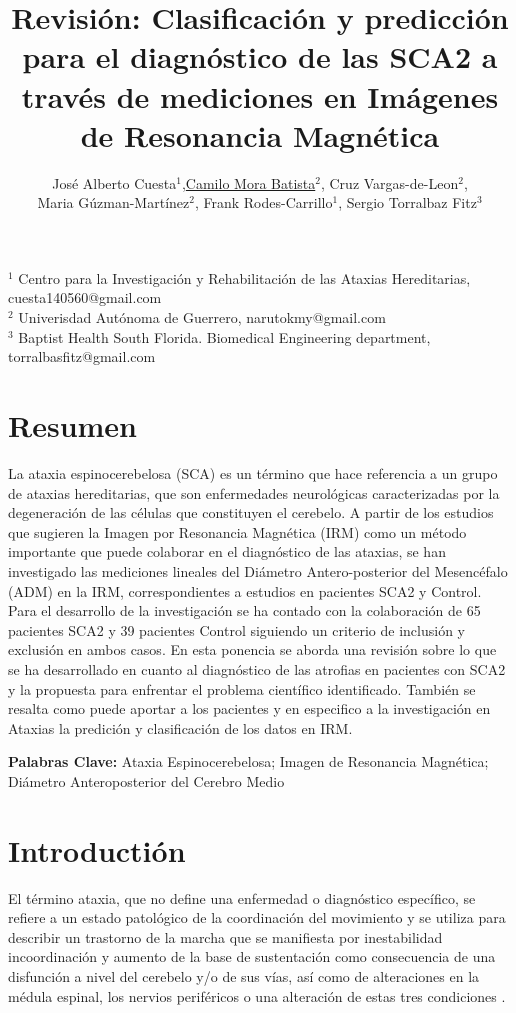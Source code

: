 \documentclass[a4paper,12pt]{article}
\title{Revisión: Clasificación y predicción para el diagnóstico de las SCA2 a través de mediciones en Imágenes de Resonancia Magnética}
\author{José Alberto Cuesta$^1$,\underline{Camilo Mora Batista}$^2$, Cruz Vargas-de-Leon$^2$, \\ Maria Gúzman-Martínez$^2$, Frank Rodes-Carrillo$^1$, Sergio Torralbaz Fitz$^3$}
\date{}
\begin{document}
	\maketitle
	
	\begin{center}
		$ ^1$ Centro para la Investigación y Rehabilitación de las Ataxias Hereditarias, cuesta140560@gmail.com \\ 
		$^2$ Univerisdad Autónoma de Guerrero, narutokmy@gmail.com\\
		$^3$ Baptist Health South Florida. Biomedical Engineering department, torralbasfitz@gmail.com
	\end{center}
	
\section*{Resumen}
	
	La ataxia espinocerebelosa (SCA) es un término que hace referencia a un grupo de ataxias hereditarias, que son enfermedades neurológicas caracterizadas por la degeneración de las células que constituyen el cerebelo. A partir de los estudios que sugieren la Imagen por Resonancia Magnética (IRM) como un método importante que puede colaborar en el diagnóstico de las ataxias, se han investigado las mediciones lineales del Diámetro Antero-posterior del Mesencéfalo (ADM) en la IRM, correspondientes a estudios en pacientes SCA2 y Control. Para el desarrollo de la investigación se ha contado con la colaboración de 65 pacientes SCA2 y 39 pacientes Control siguiendo un criterio de inclusión y exclusión en ambos casos.  En esta ponencia se aborda una revisión sobre lo que se ha desarrollado en cuanto al diagnóstico de las atrofias en pacientes con SCA2 y la propuesta para enfrentar el problema científico identificado. También se resalta como puede aportar a los pacientes y en especifico a la investigación en Ataxias la predición y clasificación de los datos en IRM. 
	
	
\textbf{Palabras Clave:}  Ataxia Espinocerebelosa; Imagen de Resonancia Magnética; Diámetro Anteroposterior del Cerebro Medio
\section{Introductión}
	
	
El término ataxia, que no define una enfermedad o diagnóstico específico, se refiere a un estado patológico de la coordinación del movimiento \cite{luis_velazquez_perez_ataxia_2012,almaguer-gotay_spinocerebellar_2017,wilke_neurofilaments_2020} y se utiliza para describir un trastorno de la marcha que se manifiesta por inestabilidad incoordinación y aumento de la base de sustentación como consecuencia de una disfunción a nivel del cerebelo y/o de sus vías, así como de alteraciones en la médula espinal, los nervios periféricos o una alteración de estas tres condiciones \cite{almaguer-gotay_spinocerebellar_2017}.
\end{document}

